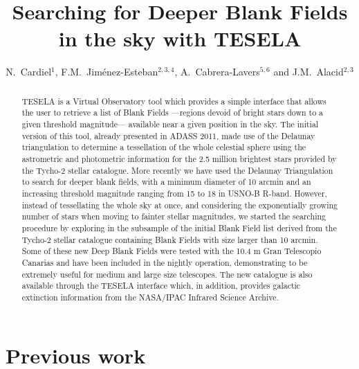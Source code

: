 \documentclass[11pt,twoside]{article}
\begin{document}
\title{Searching for Deeper Blank Fields in the sky with TESELA}
\author{N.~Cardiel$^1$, F.M.~Jim\'{e}nez-Esteban$^{2,3,4}$,
A.~Cabrera-Lavers$^{5,6}$ and J.M.~Alacid$^{2,3}$
}

\begin{abstract}
TESELA is a Virtual Observatory tool which provides a simple interface that
allows the user to retrieve a list of Blank Fields ---regions devoid of bright
stars down to a given threshold magnitude--- available near a given position in
the sky. The initial version of this tool, already presented in ADASS 2011,
made use of the Delaunay triangulation to determine a tessellation of the whole
celestial sphere using the astrometric and photometric information for the 2.5
million brightest stars provided by the Tycho-2 stellar catalogue. More
recently we have used the Delaunay Triangulation to search for deeper blank
fields, with a minimum diameter of 10 arcmin and an increasing threshold
magnitude ranging from 15 to 18 in USNO-B R-band. However, instead of
tessellating the whole sky at once, and considering the exponentially growing
number of stars when moving to fainter stellar magnitudes, we started the
searching procedure by exploring in the subsample of the initial Blank Field
list derived from the Tycho-2 stellar catalogue containing Blank Fields with
size larger than 10 arcmin. Some of these new Deep Blank Fields were
tested with the 10.4 m Gran Telescopio Canarias and have been included in the
nightly operation, demonstrating to be extremely
useful for medium and large size telescopes. The new catalogue is also
available through the TESELA interface which, in addition, provides galactic
extinction information from the NASA/IPAC Infrared Science Archive. 
\end{abstract}

\section{Previous work}
\end{document}
